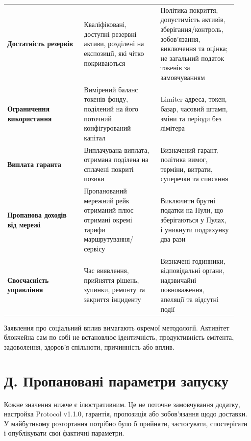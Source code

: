 \documentclass[11pt]{article}
\begin{document}
\begin{longtable}{P{0.31\linewidth} P{0.31\linewidth} P{0.31\linewidth}}
\textbf{Достатність резервів} & Кваліфіковані, доступні резервні активи, розділені на експозиції, які чітко покриваються & Політика покриття, допустимість активів, зберігання/контроль, зобов'язання, виключення та оцінка; не загальний податок токенів за замовчуванням \\
\textbf{Ограничення використання} & Вимірений баланс токенів фонду, поділений на його поточний конфігурований капітал & Limiter адреса, токен, базар, часовий штамп, зміни та періоди без лімітера \\
\textbf{Виплата гаранта} & Виплачувана виплата, отримана поділена на сплачені покриті позики & Визначений гарант, політика вимог, терміни, витрати, суперечки та списання \\
\textbf{Пропанова доходів від мережі} & Пропанований мережний рейк отриманий плюс отримані окремі тарифи маршрутування/сервісу & Виключити брутні податки на Пули, що зберігаються у Пулах, і уникнути подрахунку два рази \\
\textbf{Своєчасність управління} & Час виявлення, прийняття рішень, зупинки, ремонту та закриття інциденту & Визначені годинники, відповідальні органи, надзвичайні повноваження, апеляції та відсутні події \\
\bottomrule
\end{longtable}

Заявлення про соціальний вплив вимагають окремої методології. Активітет блокчейна сам по собі не встановлює ідентичність, продуктивність емітента, задоволення, здоров'я спільноти, причинність або вплив.


\section*{Д. Пропановані параметри запуску}

Кожне значення нижче є ілюстративним. Це не поточне замовчування додатку, настройка Protocol v1.1.0, гарантія, пропозиція або зобов'язання щодо доставки. У майбутньому розгортання потрібно було б прийняти, застосувати, спостерігати і опублікувати свої фактичні параметри.
\end{document}
